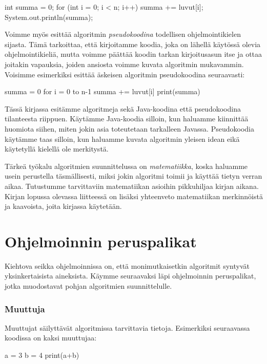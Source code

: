 \begin{code}
int summa = 0;
for (int i = 0; i < n; i++) {
    summa += luvut[i];
}
System.out.println(summa);
\end{code}


Voimme myös esittää algoritmin \emph{pseudokoodina}
todellisen ohjelmointikielen sijasta.
Tämä tarkoittaa, että kirjoitamme koodia,
joka on lähellä käytössä olevia ohjelmointikieliä, mutta voimme
päättää koodin tarkan kirjoitusasun itse ja ottaa joitakin vapauksia,
joiden ansiosta voimme kuvata algoritmin mukavammin.
Voisimme esimerkiksi esittää äskeisen algoritmin pseudokoodina seuraavasti:

\begin{code}
summa = 0
for i = 0 to n-1
    summa += luvut[i]
print(summa)
\end{code}

Tässä kirjassa esitämme algoritmeja sekä Java-koodina että pseudokoodina
tilanteesta riippuen.
Käytämme Java-koodia silloin, kun haluamme kiinnittää huomiota siihen,
miten jokin asia toteutetaan tarkalleen Javassa.
Pseudokoodia käytämme taas silloin, kun haluamme kuvata algoritmin yleisen
idean eikä käytetyllä kielellä ole merkitystä.

Tärkeä työkalu algoritmien suunnittelussa on \emph{matematiikka},
koska haluamme usein perustella täsmällisesti,
miksi jokin algoritmi toimii ja käyttää tietyn verran aikaa.
Tutustumme tarvittaviin matematiikan asioihin pikkuhiljaa kirjan aikana.
Kirjan lopussa olevassa liitteessä on lisäksi yhteenveto matematiikan
merkinnöistä ja kaavoista, joita kirjassa käytetään.

\section{Ohjelmoinnin peruspalikat}

Kiehtova seikka ohjelmoinnissa on, että monimutkaisetkin algoritmit
syntyvät yksinkertaisista aineksista.
Käymme seuraavaksi läpi ohjelmoinnin peruspalikat,
jotka muodostavat pohjan algoritmien suunnittelulle.

\subsubsection{Muuttuja}

Muuttujat säilyttävät algoritmissa tarvittavia tietoja.
Esimerkiksi seuraavassa koodissa on kaksi muuttujaa:

\begin{code}
a = 3
b = 4
print(a+b)
\end{code}


